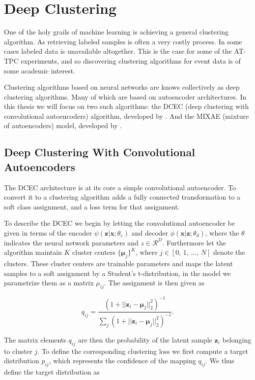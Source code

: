 \section{Deep Clustering}\label{sec:deep_clustering}

One of the holy grails of machine learning is achieving a general clustering algorithm. As retrieving labeled samples is often a very costly process. In some cases labeled data is unavailable altogether. This is the case for some of the AT-TPC experiments, and so discovering clustering algorithms for event data is of some academic interest. 

Clustering algorithms based on neural networks are knows collectively as deep clustering algorithms. Many of which are based on autoencoder architectures. In this thesis we will focus on two such algorithms: the DCEC (deep clustering with convolutional autoencoders) algorithm, developed by \citet{Guo2017}. And the MIXAE (mixture of autoencoders) model, developed by \cite{Zhang}. 

\subsection{Deep Clustering With Convolutional Autoencoders}

The DCEC architecture is at its core a simple convolutional autoencoder. To convert it to a clustering algorithm \citet{Guo2017} adds a fully connected transformation to a soft class assignment, and a loss term for that assignment. 

To describe the DCEC we begin by letting the convolutional autoencoder be given in terms of the encoder $\psi(\mathbf{z}|\mathbf{x} ; \theta_e)$ and decoder $\phi(\mathbf{x}|\mathbf{z}; \theta_d)$, where the $\theta$ indicates the neural network parameters and $z \in \mathcal{R}^D$. Furthermore let the algorithm maintain $K$ cluster centers $\{\mathbf{\mu}_j\}^K$, where $j \in [0,\, 1,\, \dots,\, N]$ denote the clusters. These cluster centers are trainable parameters and maps the latent samples to a soft assignment by a Student's t-distribution, in the model we parametrize them as a matrix $\mu_{ij}$. The assignment is then given as 

\begin{equation}\label{eq:qij}
q_{ij} = \frac{(1 + ||\mathbf{z}_i - \mathbf{\mu}_j||^2_2)^{-1}}{\sum_j(1 + ||\mathbf{z}_i - \mathbf{\mu}_j||^2_2)^{-1}}.
\end{equation}

\noindent The matrix elements $q_{ij}$ are then the probability of the latent sample $\mathbf{z}_i$ belonging to cluster $j$. To define the corresponding clustering loss we first compute a target distribution $p_{ij}$, which represents the confidence of the mapping $q_{ij}$. We thus define the target distribution as 

